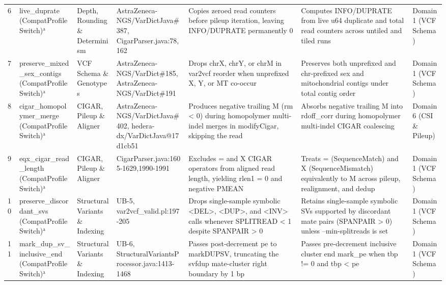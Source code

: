 \begin{table}[htbp]
{\begin{tabular}{lllllll}
6 & live\_duprate (CompatProfile Switch)$^{\text{a}}$ & Depth, Rounding \& Determinism & AstraZeneca-NGS/VarDictJava\#387, CigarParser.java:78,162 & Copies zeroed read counters before pileup iteration, leaving INFO/DUPRATE permanently 0 & Computes INFO/DUPRATE from live u64 duplicate and total read counters across untiled and tiled runs & Domain 1 (VCF Schema) \\
7 & preserve\_mixed\_sex\_contigs (CompatProfile Switch)$^{\text{a}}$ & VCF Schema \& Genotypes & AstraZeneca-NGS/VarDict\#185, AstraZeneca-NGS/VarDict\#191 & Drops chrX, chrY, or chrM in var2vcf reorder when unprefixed X, Y, or MT co-occur & Preserves both unprefixed and chr-prefixed sex and mitochondrial contigs under total contig order & Domain 1 (VCF Schema) \\
8 & cigar\_homopolymer\_merge (CompatProfile Switch)$^{\text{a}}$ & CIGAR, Pileup \& Aligner & AstraZeneca-NGS/VarDictJava\#402, hedera-dx/VarDictJava@17d1cb51 & Produces negative trailing M (rm \textless{} 0) during homopolymer multi-indel merges in modifyCigar, skipping the read & Absorbs negative trailing M into rdoff\_corr during homopolymer multi-indel CIGAR coalescing & Domain 6 (CSI \& Pileup) \\
9 & eqx\_cigar\_read\_length (CompatProfile Switch)$^{\text{a}}$ & CIGAR, Pileup \& Aligner & CigarParser.java:1605-1629,1990-1991 & Excludes = and X CIGAR operators from aligned read length, yielding rlen1 = 0 and negative PMEAN & Treats = (SequenceMatch) and X (SequenceMismatch) equivalently to M across pileup, realignment, and dedup & Domain 1 (VCF Schema) \\
10 & preserve\_discordant\_svs (CompatProfile Switch)$^{\text{a}}$ & Structural Variants \& Indexing & UB-5, var2vcf\_valid.pl:197-205 & Drops single-sample symbolic \textless{}DEL\textgreater{}, \textless{}DUP\textgreater{}, and \textless{}INV\textgreater{} calls whenever SPLITREAD \textless{} 1 despite SPANPAIR \textgreater{} 0 & Retains single-sample symbolic SVs supported by discordant mate pairs (SPANPAIR \textgreater{} 0) unless --min-splitreads is set & Domain 1 (VCF Schema) \\
11 & mark\_dup\_sv\_inclusive\_end (CompatProfile Switch)$^{\text{a}}$ & Structural Variants \& Indexing & UB-6, StructuralVariantsProcessor.java:1413-1468 & Passes post-decrement pe to markDUPSV, truncating the svfdup mate-cluster right boundary by 1 bp & Passes pre-decrement inclusive cluster end mark\_pe when tbp != 0 and tbp \textless{} pe & Domain 1 (VCF Schema) \\

\end{tabular}}
\end{table}
